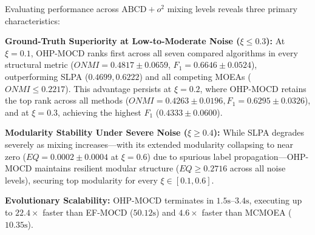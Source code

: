 \documentclass{svproc}
\begin{document}
Evaluating performance across $\text{ABCD}+o^2$ mixing levels reveals three primary characteristics:

\noindent\textbf{Ground-Truth Superiority at Low-to-Moderate Noise ($\xi \le 0.3$):} At $\xi = 0.1$, OHP-MOCD ranks first across all seven compared algorithms in every structural metric ($ONMI = 0.4817 \pm 0.0659$, $F_1 = 0.6646 \pm 0.0524$), outperforming SLPA ($0.4699, 0.6222$) and all competing MOEAs ($ONMI \le 0.2217$). This advantage persists at $\xi = 0.2$, where OHP-MOCD retains the top rank across all methods ($ONMI = 0.4263 \pm 0.0196, F_1 = 0.6295 \pm 0.0326$), and at $\xi = 0.3$, achieving the highest $F_1$ ($0.4333 \pm 0.0600$).

\noindent\textbf{Modularity Stability Under Severe Noise ($\xi \ge 0.4$):} While SLPA degrades severely as mixing increases---with its extended modularity collapsing to near zero ($EQ = 0.0002 \pm 0.0004$ at $\xi = 0.6$) due to spurious label propagation---OHP-MOCD maintains resilient modular structure ($EQ \ge 0.2716$ across all noise levels), securing top modularity for every $\xi \in [0.1, 0.6]$.

\noindent\textbf{Evolutionary Scalability:} OHP-MOCD terminates in $1.5\text{s}$--$3.4\text{s}$, executing up to $22.4\times$ faster than EF-MOCD ($50.12\text{s}$) and $4.6\times$ faster than MCMOEA ($10.35\text{s}$).
\end{document}
